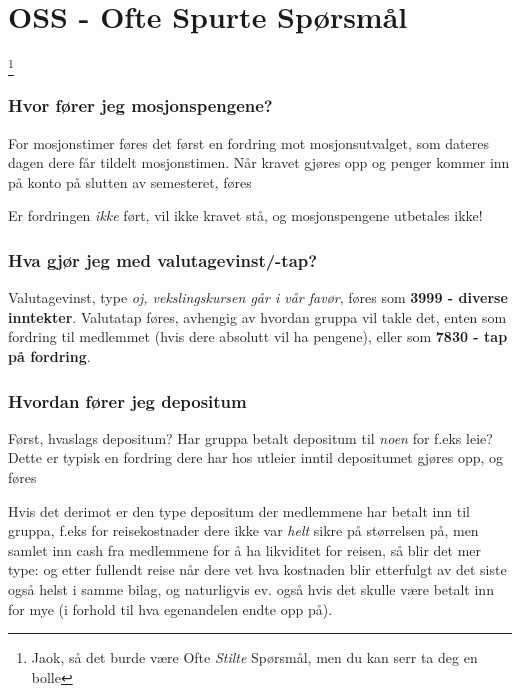 \section{OSS - Ofte Spurte Spørsmål}
\let\thefootnote\relax\footnote{Jaok, så det burde være Ofte \emph{Stilte} Spørsmål, men du kan serr ta deg en bolle}

\subsubsection*{Hvor fører jeg mosjonspengene?}
For mosjonstimer føres det først en fordring mot mosjonsutvalget, som dateres dagen dere får tildelt mosjonstimen.
Når kravet gjøres opp og penger kommer inn på konto på slutten av semesteret, føres

Er fordringen \emph{ikke} ført, vil ikke kravet stå, og mosjonspengene utbetales ikke!

\subsubsection*{Hva gjør jeg med valutagevinst/-tap?}
Valutagevinst, type \emph{oj, vekslingskursen går i vår favør}, føres som {\bfseries 3999 - diverse inntekter}. \newline
Valutatap føres, avhengig av hvordan gruppa vil takle det, enten som fordring til medlemmet (hvis dere absolutt vil ha pengene), eller som {\bfseries 7830 - tap på fordring}.

\subsubsection*{Hvordan fører jeg depositum}
Først, hvaslags depositum? Har gruppa betalt depositum til \emph{noen} for f.eks leie? Dette er typisk en fordring dere har hos utleier inntil depositumet gjøres opp, og føres 

Hvis det derimot er den type depositum der medlemmene har betalt inn til gruppa, f.eks for reisekostnader dere ikke var \emph{helt} sikre på størrelsen på, men samlet inn cash fra medlemmene for å ha likviditet for reisen, så blir det mer type:
og etter fullendt reise når dere vet hva kostnaden blir
etterfulgt av
det siste også helst i samme bilag, og naturligvis ev. også
hvis det skulle være betalt inn for mye (i forhold til hva egenandelen endte opp på).
